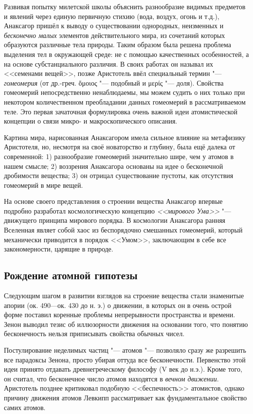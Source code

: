 \documentclass[a4paper, 12pt, oneside]{article} %
\begin{document}
Развивая попытку милетской школы объяснить разнообразие видимых
предметов и явлений через единую первичную стихию (вода, воздух, огонь и
т.д.), Анаксагор пришёл к выводу о существовании однородных, неизменных
и \emph{бесконечно малых} элементов действительного мира, из сочетаний
которых образуются различные тела природы. Таким образом была решена
проблема выделения тел в окружающей среде: не с помощью качественных
особенностей, а на основе субстанциального различия. В своих работах он
называл их <<семенами вещей>>, позже Аристотель ввёл специальный термин
"--- \emph{гомеомерия} (от др.-греч. \foreignlanguage{greek}{ὅμοιος} "---
подобный и \foreignlanguage{greek}{μερίς} "--- доля). Свойства гомеомерий
непосредственно ненаблюдаемы, мы можем судить о них только при
некотором количественном преобладании данных гомеомерий в
рассматриваемом теле. Это первая зачаточная формулировка очень важной
идеи атомистической концепции о связи микро- и макроскопического
описания.

Картина мира, нарисованная Анаксагором имела сильное влияние на
метафизику Аристотеля, но, несмотря на своё новаторство и глубину, была
ещё далека от современной: 1) разнообразие гомеомерий значительно шире,
чем у атомов в нашем смысле; 2) воззрения Анаксагора основаны на идее о
бесконечной дробимости вещества; 3) он отрицал существование пустоты,
как отсутствия гомеомерий в мире вещей.

На основе своего представления о строении вещества Анаксагор впервые
подробно разработал космологическую концепцию \emph{<<мирового Ума>>}
"--- движущего принципа мирового порядка. В космологии Анаксагора ранняя
Вселенная являет собой хаос из беспорядочно смешанных гомеомерий,
который механически приводится в порядок <<Умом>>, заключающим в себе
все закономерности, царящие в природе.

\subsection{Рождение атомной гипотезы}

Следующим шагом в развитии взглядов на строение вещества стали
знаменитые апории  (ок. 490---ок. 430 до н. э.) о
движении, в которых он в очень острой форме поставил коренные проблемы
непрерывности пространства и времени. Зенон выводил тезис об
иллюзорности движения на основании того, что понятию бесконечность
нельзя приписывать свойства обычных чисел.

Постулирование неделимых частиц "--- атомов "--- позволяло сразу же
разрешить все парадоксы Зенона, просто убирая оттуда все бесконечности.
Первенство этой идеи принято отдавать древнегреческому философу
 (V век до н.э.). Кроме того, он считал, что
бесконечное число атомов находятся в \emph{вечном движении}. Аристотель
позднее критиковал подобную <<беспечность>> атомистов, однако причину
движения атомов Левкипп рассматривает как фундаментальное свойство самих
атомов.
\end{document}
